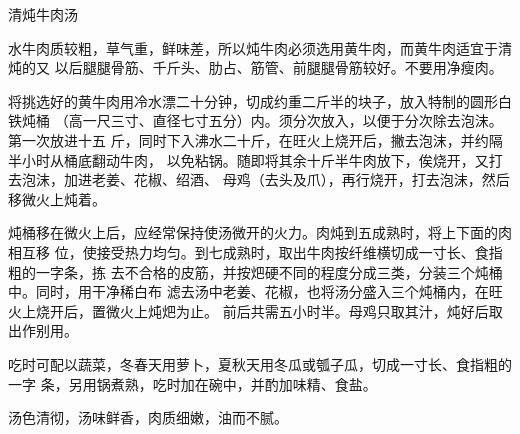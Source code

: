 \begin{recipe}{清炖牛肉汤}

\ingredients


\preparation

水牛肉质较粗，草气重，鲜味差，所以炖牛肉必须选用黄牛肉，而黄牛肉适宜于清炖的又
以后腿腿骨筋、千斤头、肋占、筋管、前腿腿骨筋较好。不要用净瘦肉。

将挑选好的黄牛肉用冷水漂二十分钟，切成约重二斤半的块子，放入特制的圆形白铁炖桶
（高一尺三寸、直径七寸五分）内。须分次放入，以便于分次除去泡沫。第一次放进十五
斤，同时下入沸水二十斤，在旺火上烧开后，撇去泡沫，并约隔半小时从桶底翻动牛肉，
以免粘锅。随即将其余十斤半牛肉放下，俟烧开，又打去泡沫，加进老姜、花椒、绍酒、
母鸡（去头及爪），再行烧开，打去泡沫，然后移微火上炖着。

炖桶移在微火上后，应经常保持使汤微开的火力。肉炖到五成熟时，将上下面的肉相互移
位，使接受热力均匀。到七成熟时，取出牛肉按纤维横切成一寸长、食指粗的一字条，拣
去不合格的皮筋，并按𤆵硬不同的程度分成三类，分装三个炖桶中。同时，用干净稀白布
滤去汤中老姜、花椒，也将汤分盛入三个炖桶内，在旺火上烧开后，置微火上炖𤆵为止。
前后共需五小时半。母鸡只取其汁，炖好后取出作别用。

吃时可配以蔬菜，冬春天用萝卜，夏秋天用冬瓜或瓠子瓜，切成一寸长、食指粗的一字
条，另用锅煮熟，吃时加在碗中，并酌加味精、食盐。

\features

汤色清彻，汤味鲜香，肉质细嫩，油而不腻。

\end{recipe}

